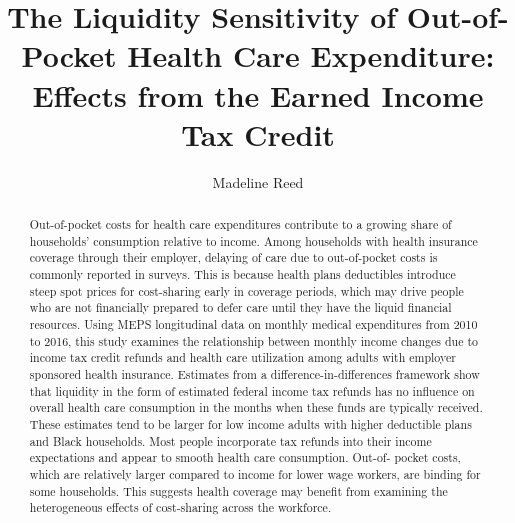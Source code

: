 \documentclass[smallcondensed,referee]{svjour3}
\begin{document}
\title{The Liquidity Sensitivity of Out-of-Pocket Health Care Expenditure: Effects from the Earned Income Tax Credit}
\author{Madeline Reed}

\date{}

\maketitle

\begin{abstract}
Out-of-pocket costs for health care expenditures contribute to a growing share of households’ consumption relative to income. Among households with health insurance coverage through their employer, delaying of care due to out-of-pocket costs is commonly reported in surveys. This is because health plans deductibles introduce steep spot prices for cost-sharing early in coverage periods, which may drive people who are not financially prepared to defer care until they have the liquid financial resources. Using MEPS longitudinal data on monthly medical expenditures from 2010 to 2016, this study examines the relationship between monthly income changes due to income tax credit refunds and health care utilization among adults with employer sponsored health insurance. Estimates from a difference-in-differences framework show that liquidity in the form of estimated federal income tax refunds has no influence on overall health care consumption in the months when these funds are typically received. These estimates tend to be larger for low income adults with higher deductible plans and Black households. Most people incorporate tax refunds into their income expectations and appear to smooth health care consumption. Out-of- pocket costs, which are relatively larger compared to income for lower wage workers, are binding for some households. This suggests health coverage may benefit from examining the heterogeneous effects of cost-sharing across the workforce.

 
 
\end{abstract}
\end{document}

